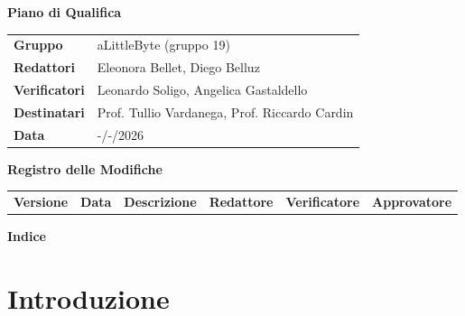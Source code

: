 \documentclass[a4paper,12pt]{article}
\begin{document}
\thispagestyle{firstpage}

\vspace*{0.5cm}

\begin{center}
    {\LARGE \textbf{Piano di Qualifica}}
\end{center}

\vspace{1.5cm}

\begin{center}
    \renewcommand{\arraystretch}{1.3}
    \begin{tcolorbox}[
        width=0.92\textwidth,
        colback=gray!6,
        colframe=gray!45,
        boxrule=0.5pt,
        arc=2mm,
        boxsep=0pt,
        left=8pt, right=8pt, top=8pt, bottom=8pt
    ]
        \begin{tabularx}{\linewidth}{>{\bfseries}p{3.5cm} X}
            Gruppo      & aLittleByte (gruppo 19) \\
            Redattori   & Eleonora Bellet, Diego Belluz \\
            Verificatori& Leonardo Soligo, Angelica Gastaldello\\
            Destinatari & Prof. Tullio Vardanega, Prof. Riccardo Cardin \\
            Data        & -/-/2026 \\
        \end{tabularx}
    \end{tcolorbox}
\end{center}

\newpage


\begin{center}
    {\Large \textbf{Registro delle Modifiche}}
\end{center}

\vspace{0.35cm}

\renewcommand{\arraystretch}{1.35}
\begin{center}
    {\footnotesize
    \begin{tabularx}{\textwidth}{|p{1.4cm}|p{1.8cm}|X|p{2.4cm}|p{2.3cm}|p{2.3cm}|}
        \hline
        \rowcolor{gray!20}
        \textbf{Versione} & \textbf{Data} & \textbf{Descrizione} & \textbf{Redattore} & \textbf{Verificatore} & \textbf{Approvatore} \\
        
        
    \end{tabularx}
    }
    
\end{center}
\newpage

\begin{center} 
    {\Large \textbf{Indice}}
\end{center}

\vspace{0.6cm}

\tableofcontents

\newpage
{}
\setcounter{page}{4}

\section{Introduzione}
\end{document}
